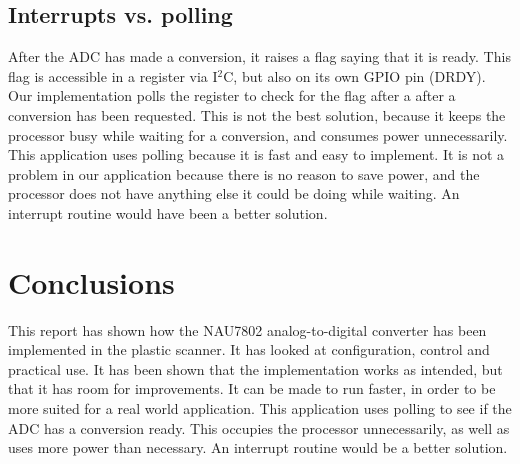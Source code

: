 \documentclass[12pt, a4paper]{article}
\begin{document}
        \subsection{Interrupts vs. polling}

            After the ADC has made a conversion, it raises a flag saying that it is ready.
            This flag is accessible in a register via I$^2$C, but also on its own GPIO pin (DRDY).
            Our implementation polls the register to check for the flag after a
            after a conversion has been requested. This is not the best solution, because it
            keeps the processor busy while waiting for a conversion, and consumes power
            unnecessarily. This application uses polling because it is fast and easy to implement. It is
            not a problem in our application because there is no reason to save power, and the
            processor does not have anything else it could be doing while waiting. An interrupt
            routine would have been a better solution.
    \clearpage
    \section{Conclusions}
            
            This report has shown how the NAU7802 analog-to-digital converter has been implemented in the plastic scanner.
            It has looked at configuration, control and practical use.
            It has been shown that the implementation works as intended, but that it has room for improvements. It can be
            made to run faster, in order to be more suited for a real world application.
            This application uses polling to see if the ADC has a conversion ready. This occupies the processor
            unnecessarily, as well as uses more power than necessary.
            An interrupt routine would be a better solution.
            

    \clearpage
    
    
\end{document}
